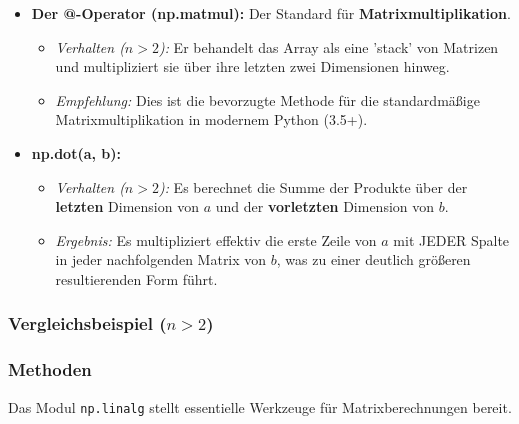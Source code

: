 \begin{itemize}
    \item \textbf{Der @-Operator (np.matmul):} Der Standard für \textbf{Matrixmultiplikation}.
    \begin{itemize}
        \item \textit{Verhalten ($n > 2$):} Er behandelt das Array als eine 'stack' von Matrizen und multipliziert sie über ihre letzten zwei Dimensionen hinweg.
        \item \textit{Empfehlung:} Dies ist die bevorzugte Methode für die standardmäßige Matrixmultiplikation in modernem Python (3.5+).
    \end{itemize}
    
    \item \textbf{np.dot(a, b):}
    \begin{itemize}
        \item \textit{Verhalten ($n > 2$):} Es berechnet die Summe der Produkte über der \textbf{letzten} Dimension von $a$ und der \textbf{vorletzten} Dimension von $b$.
        \item \textit{Ergebnis:} Es multipliziert effektiv die erste Zeile von $a$ mit JEDER Spalte in jeder nachfolgenden Matrix von $b$, was zu einer deutlich größeren resultierenden Form führt.
    \end{itemize}
\end{itemize}

\subsubsection{Vergleichsbeispiel ($n > 2$)}


\subsubsection{Methoden}
Das Modul \texttt{np.linalg} stellt essentielle Werkzeuge für Matrixberechnungen bereit.

